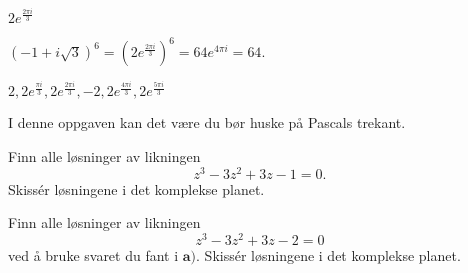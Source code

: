 \begin{losning}
\begin{punkt}
$2e^{\frac{2\pi i}{3}}$
\end{punkt}

\begin{punkt}
$(-1+i\sqrt{3})^6=(2e^{\frac{2\pi i}{3}})^6=64e^{4\pi i}=64.$
\end{punkt}

\begin{punkt}
$2,2e^{\frac{\pi i}{3}},2e^{\frac{2\pi i}{3}},-2,2e^{\frac{4\pi i}{3}},2e^{\frac{5\pi i}{3}}$


\begin{center}
\end{center}


\end{punkt}

\end{losning}


\begin{oppgave}
I denne oppgaven kan det være du bør huske på Pascals trekant.
\begin{punkt}
Finn alle løsninger av likningen $$z^3-3z^2+3z-1=0.$$ Skissér løsningene i det komplekse planet.
\end{punkt}
\begin{punkt}
Finn alle løsninger av likningen $$z^3-3z^2+3z-2=0$$ ved å bruke svaret du fant i $\textbf{a)}$. Skissér løsningene i det komplekse planet.
\end{punkt}
\end{oppgave}

